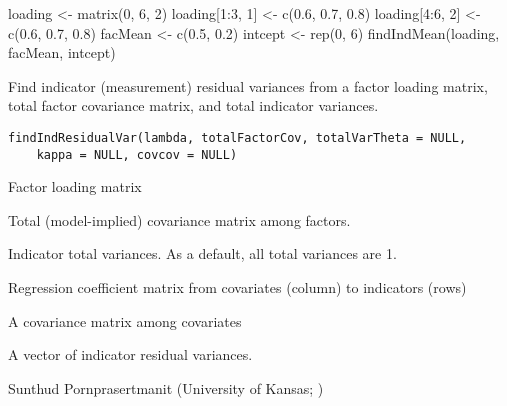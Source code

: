 \documentclass[a4paper]{book}
\begin{document}
%
\begin{Examples}
\begin{ExampleCode}
loading <- matrix(0, 6, 2)
loading[1:3, 1] <- c(0.6, 0.7, 0.8)
loading[4:6, 2] <- c(0.6, 0.7, 0.8)
facMean <- c(0.5, 0.2)
intcept <- rep(0, 6)
findIndMean(loading, facMean, intcept)
\end{ExampleCode}
\end{Examples}
%
\begin{Description}\relax
Find indicator (measurement) residual variances from a factor loading matrix, total factor covariance matrix, and total indicator variances.
\end{Description}
%
\begin{Usage}
\begin{verbatim}
findIndResidualVar(lambda, totalFactorCov, totalVarTheta = NULL, 
	kappa = NULL, covcov = NULL)
\end{verbatim}
\end{Usage}
%
\begin{Arguments}
\begin{ldescription}
\item[\code{lambda}] 
Factor loading matrix

\item[\code{totalFactorCov}] 
Total (model-implied) covariance matrix among factors. 

\item[\code{totalVarTheta}] 
Indicator total variances. As a default, all total variances are 1.

\item[\code{kappa}] 
Regression coefficient matrix from covariates (column) to indicators (rows)

\item[\code{covcov}] 
A covariance matrix among covariates

\end{ldescription}
\end{Arguments}
%
\begin{Value}
A vector of indicator residual variances.
\end{Value}
%
\begin{Author}\relax
Sunthud Pornprasertmanit (University of Kansas; )
\end{Author}
%
\end{document}
